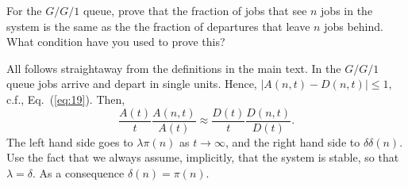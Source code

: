 \begin{exercise}
  For the $G/G/1$ queue, prove that the fraction of jobs that see $n$
  jobs in the system is the same as the the fraction of departures that
  leave $n$ jobs behind. What condition have you used to prove this?
  \begin{solution}
    All follows straightaway from the definitions in the main text. In
    the $G/G/1$ queue jobs arrive and depart in single units. Hence,
    $|A(n,t)-D(n,t)|\leq 1$, c.f., Eq.~(\ref{eq:19}). Then, 
    \begin{equation*}
      \frac{A(t)}{t}\frac{A(n,t)}{A(t)} \approx 
      \frac{D(t)}{t}\frac{D(n,t)}{D(t)}. 
    \end{equation*}
    The left hand side goes to $\lambda \pi(n)$ as $t\to\infty$, and
    the right hand side to $\delta \delta(n)$. Use the fact that we
    always assume, implicitly, that the system is stable, so that
    $\lambda = \delta$. As a consequence $\delta(n) = \pi(n)$.
  \end{solution}
\end{exercise}

